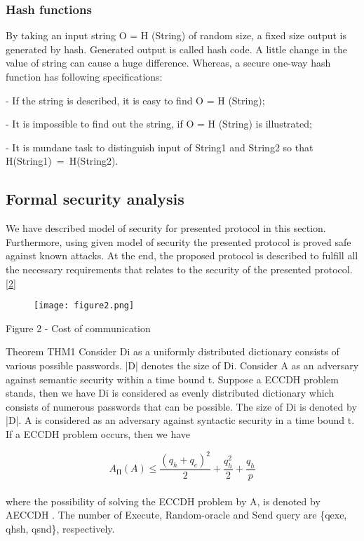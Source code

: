 \documentclass[preprint]{oscmjournal}
\begin{document}
\subsubsection{Hash functions}

By taking an input string O = H (String) of random size, a fixed size output is generated by hash. Generated output is called hash code. A little change in the value of string can cause a huge difference. Whereas, a secure one-way hash function has following specifications: 

- If the string is described, it is easy to find O = H (String);

- It is impossible to find out the string, if O = H (String) is illustrated;

- It is mundane task to distinguish input of String1 and String2 so that H(String1) = H(String2). 

\subsection{Formal security analysis}

We have described model of security for presented protocol in this section. Furthermore, using given model of security the presented protocol is proved safe against known attacks. At the end, the proposed protocol is described to fulfill all the necessary requirements that relates to the security of the presented protocol. \href{ Figure 2 - Cost of communication}{[2]}

\begin{figure}[H]
    \centering
    \texttt{[image: figure2.png]}

    \label{ Figure 2 - Cost of communication}
\end{figure}

Figure 2 - Cost of communication

Theorem THM1 Consider Di as a uniformly distributed dictionary consists of various possible passwords. |D| denotes the size of Di. Consider A as an adversary against semantic security within a time bound t. Suppose a ECCDH problem stands, then we have Di is considered as evenly distributed dictionary which consists of numerous passwords that can be possible. The size of Di is denoted by |D|. A is considered as an adversary against syntactic security in a time bound t. If a ECCDH problem occurs, then we have
\centering

 \[
 A_П(A)≤ \frac{(q_h+q_e)^2}{2} + \frac{q_h^2}{2} + \frac{q_h}{p}
 \]  \\
where the possibility of solving the ECCDH problem by A, is denoted by AECCDH ­. The number of Execute, Random-oracle and Send query are \{qexe, qhsh, qsnd\}, respectively.
\end{document}
